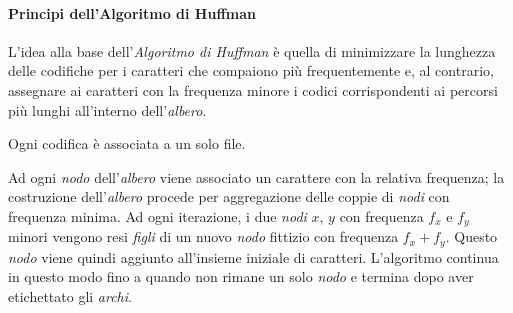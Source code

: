 \paragraph{Principi dell'Algoritmo di Huffman}
L'idea alla base dell'\emph{Algoritmo di Huffman} è quella di minimizzare la
lunghezza delle codifiche per i caratteri che compaiono più frequentemente e,
al contrario, assegnare ai caratteri con la frequenza minore i codici
corrispondenti ai percorsi più lunghi all'interno dell'\emph{albero}.

\begin{note}
    Ogni codifica è associata a un solo file.
\end{note}

\noindent
Ad ogni \emph{nodo} dell'\emph{albero} viene associato un carattere con la relativa
frequenza; la costruzione dell'\emph{albero} procede per aggregazione delle
coppie di \emph{nodi} con frequenza minima. Ad ogni iterazione, i due \emph{nodi}
$x$, $y$ con frequenza $f_x$ e $f_y$ minori vengono resi \emph{figli} di un
nuovo \emph{nodo} fittizio con frequenza $f_x+f_y$. Questo \emph{nodo} viene
quindi aggiunto all'insieme iniziale di caratteri. L'algoritmo continua in questo
modo fino a quando non rimane un solo \emph{nodo} e termina dopo aver etichettato
gli \emph{archi}.

